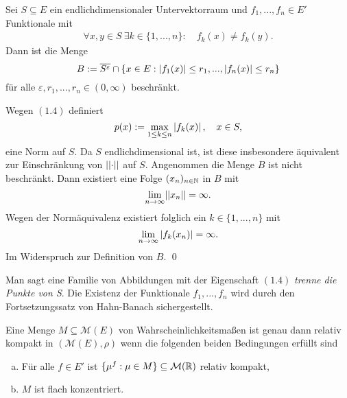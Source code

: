 \begin{lemma}
    Sei $S \subseteq E$ ein endlichdimensionaler Untervektorraum und $f_1,...,f_n \in E'$ Funktionale mit 
    \begin{align}
        \forall x,y \in S \ \exists k \in \{1,...,n\}: \quad f_k(x) \neq f_k(y).
    \end{align}
    Dann ist die Menge 
    $$
        B := \overline{S^{\varepsilon}} \cap \{x \in E: \left| f_1(x) \right| \leq r_1,...,\left| f_n(x) \right|\leq r_n\}
    $$
    für alle $\varepsilon, r_1,...,r_n \in (0, \infty)$ beschränkt. 
\end{lemma}

\begin{proof*}
    Wegen $(1.4)$ definiert 
    $$
        p(x) := \max_{1\leq k \leq n} \left| f_k(x) \right|, \quad x \in S,
    $$
    eine Norm auf $S$. Da $S$ endlichdimensional ist, ist diese insbesondere äquivalent zur Einschränkung von $\lvert\lvert \cdot \rvert\rvert$ auf $S$. 
    Angenommen die Menge $B$ ist nicht beschränkt. Dann existiert eine Folge $(x_n)_{n \in \mathbb{N}}$ in $B$ mit 
    $$
        \lim_{n \to \infty} \lvert\lvert x_n \rvert\rvert = \infty. 
    $$
    Wegen der Normäquivalenz existiert folglich ein $k \in \{1,...,n\}$ mit 
    $$
        \lim_{n \to \infty}\left| f_k(x_n) \right| = \infty. 
    $$
    Im Widerspruch zur Definition von $B$. \qed
\end{proof*}

\begin{remark}%
    Man sagt eine Familie von Abbildungen mit der Eigenschaft $(1.4)$ \textit{trenne die Punkte von S}.
    Die Existenz der Funktionale $f_1,...,f_n$ wird durch den Fortsetzungssatz von Hahn-Banach sichergestellt. 
\end{remark}

\begin{theorem}
    Eine Menge $M \subseteq \mathcal{M}(E)$ von Wahrscheinlichkeitsmaßen ist genau dann relativ kompakt in $(\mathcal{M}(E), \rho)$ wenn die folgenden beiden Bedingungen erfüllt sind
    \begin{enumerate}[(a)]
        \item Für alle $f \in E'$ ist $\{\mu^f : \mu \in M\} \subseteq \mathcal{M}(\mathbb{R})$ relativ kompakt,
        \item $M$ ist flach konzentriert. 
    \end{enumerate}
\end{theorem}


